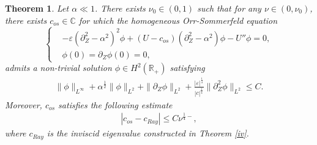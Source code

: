 \documentclass[reqno,11pt]{amsart}
\numberwithin{equation}{section}
\numberwithin{equation}{section}
\theoremstyle{plain}
\newtheorem{theorem}{Theorem}[section]
\begin{document}
\begin{theorem}\label{thm-OSeq-solution}
    Let $\alpha\ll1$. There exists $\nu_0\in (0,1)$ such that for any $\nu\in (0,\nu_0)$, there exists $c_{os}\in\mathbb{C}$ for which the homogeneous Orr-Sommerfeld equation
    \begin{equation}\label{oseq}
    	\left\{
    	\begin{aligned}
    	&-\varepsilon (\partial_Z^2-\alpha^2)^2\phi +(U-c_{os})(\partial_Z^2-\alpha^2)\phi-U''\phi=0,\\
    	&\phi(0)=\partial_Z\phi(0)=0,
    	\end{aligned}
    \right.
    \end{equation}
admits a non-trivial solution $\phi\in H^2(\mathbb{R}_+)$ satisfying
\begin{align}
	\|\phi\|_{L^\infty}+\alpha^{\frac12}\|\phi\|_{L^2}+\|\partial_Z\phi\|_{L^2}+\frac{|\varepsilon|^{\frac14}}{|c|^{\frac14}}\|\partial_Z^2\phi\|_{L^2}\leq C.\label{bdphi}
\end{align}
Moreover, $c_{os}$ satisfies the following estimate
\begin{align}
	|c_{os}-c_{Ray}|\leq C\nu^{\frac14-},\nonumber
\end{align}
where $c_{Ray}$ is the inviscid eigenvalue constructed in Theorem \ref{iv}.
\end{theorem}
\end{document}
